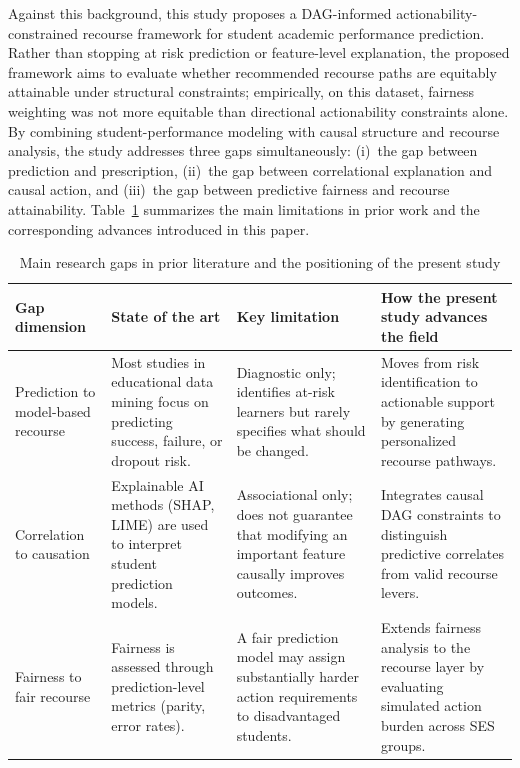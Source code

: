 \documentclass[11pt]{article}
\begin{document}
Against this background, this study proposes a DAG-informed actionability-constrained recourse framework for student academic performance prediction. Rather than stopping at risk prediction or feature-level explanation, the proposed framework aims to evaluate whether recommended recourse paths are equitably attainable under structural constraints; empirically, on this dataset, fairness weighting was not more equitable than directional actionability constraints alone. By combining student-performance modeling with causal structure and recourse analysis, the study addresses three gaps simultaneously: (i)~the gap between prediction and prescription, (ii)~the gap between correlational explanation and causal action, and (iii)~the gap between predictive fairness and recourse attainability. Table~\ref{tab:research_gaps} summarizes the main limitations in prior work and the corresponding advances introduced in this paper.

\begin{table}[H]
\centering
\caption{Main research gaps in prior literature and the positioning of the present study}
\label{tab:research_gaps}
\renewcommand{\arraystretch}{1.2}
\setlength{\tabcolsep}{5pt}
\begin{tabularx}{\textwidth}{>{\raggedright\arraybackslash}p{2.6cm} >{\raggedright\arraybackslash}X >{\raggedright\arraybackslash}X >{\raggedright\arraybackslash}X}
\toprule
\textbf{Gap dimension} & \textbf{State of the art} & \textbf{Key limitation} & \textbf{How the present study advances the field} \\
\midrule

Prediction to model-based recourse
& Most studies in educational data mining focus on predicting success, failure, or dropout risk.
& Diagnostic only; identifies at-risk learners but rarely specifies what should be changed.
& Moves from risk identification to actionable support by generating personalized recourse pathways. \\

Correlation to causation
& Explainable AI methods (SHAP, LIME) are used to interpret student prediction models.
& Associational only; does not guarantee that modifying an important feature causally improves outcomes.
& Integrates causal DAG constraints to distinguish predictive correlates from valid recourse levers. \\

Fairness to fair recourse
& Fairness is assessed through prediction-level metrics (parity, error rates).
& A fair prediction model may assign substantially harder action requirements to disadvantaged students.
& Extends fairness analysis to the recourse layer by evaluating simulated action burden across SES groups. \\

\bottomrule
\end{tabularx}
\end{table}
\end{document}
